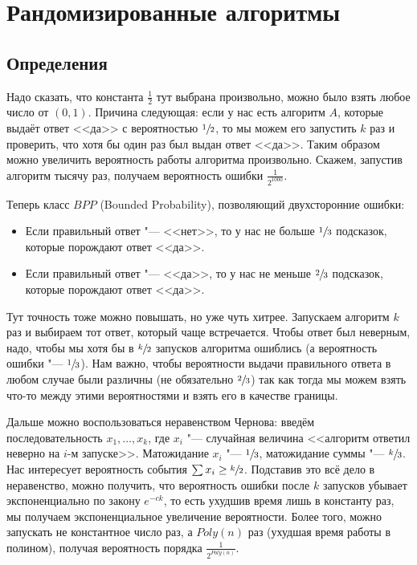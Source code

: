 \chapter{Рандомизированные алгоритмы}

\section{Определения}
\TODO

Надо сказать, что константа $\frac 12$ тут выбрана произвольно, можно было взять любое число от $(0,1)$.
Причина следующая: если у нас есть алгоритм $A$, которые выдаёт ответ <<да>> с вероятностью $\sfrac 1 2$,
то мы можем его запустить $k$ раз и проверить, что хотя бы один раз был выдан ответ <<да>>.
Таким образом можно увеличить вероятность работы алгоритма произвольно.
Скажем, запустив алгоритм тысячу раз, получаем вероятность ошибки $\frac{1}{2^{1000}}$.

Теперь класс $BPP$ (Bounded Probability), позволяющий двухсторонние ошибки:
\begin{itemize}
	\item
		Если правильный ответ "--- <<нет>>, то у нас не больше $\sfrac 13$ подсказок, которые
		порождают ответ <<да>>.
	\item
		Если правильный ответ "--- <<да>>, то у нас не меньше $\sfrac 23$ подсказок, которые
		порождают ответ <<да>>.
\end{itemize}
Тут точность тоже можно повышать, но уже чуть хитрее.
Запускаем алгоритм $k$ раз и выбираем тот ответ, который чаще встречается.
Чтобы ответ был неверным, надо, чтобы мы хотя бы в $\sfrac k2$ запусков алгоритма ошиблись
(а вероятность ошибки "--- $\sfrac 13$).
Нам важно, чтобы вероятности выдачи правильного ответа в любом случае были различны (не обязательно $\sfrac 23$)
так как тогда мы можем взять что-то между этими вероятностями и взять его в качестве границы.

Дальше можно воспользоваться неравенством Чернова: введём последовательность $x_1, \dots, x_k$,
где $x_i$ "--- случайная величина <<алгоритм ответил неверно на $i$-м запуске>>.
Матожидание $x_i$ "--- $\sfrac 13$, матожидание суммы "--- $\sfrac{k}{3}$.
Нас интересует вероятность события $\sum x_i \ge\sfrac k 2$.
Подставив это всё дело в неравенство, можно получить, что вероятность ошибки после $k$ запусков
убывает экспоненциально по закону $e^{-ck}$, то есть ухудшив время лишь в константу раз,
мы получаем экспоненциальное увеличение вероятности.
Более того, можно запускать не константное число раз, а $Poly(n)$ раз (ухудшая время работы в полином),
получая вероятность порядка $\frac{1}{2^{Poly(n)}}$.


